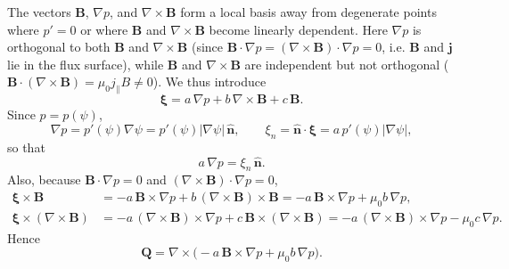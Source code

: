 \documentclass[10pt,a4paper]{article}
\numberwithin{equation}{section}
\begin{document}
The vectors $\mathbf{B}$, $\nabla p$, and $\nabla\times\mathbf{B}$ form a local
basis away from degenerate points where \(p'=0\) or where \(\mathbf B\) and
\(\nabla\times\mathbf B\) become linearly dependent.  Here $\nabla p$ is
orthogonal to both $\mathbf B$ and $\nabla\times\mathbf B$ (since
$\mathbf{B}\cdot\nabla p = (\nabla\times\mathbf{B})\cdot\nabla p = 0$, i.e.
$\mathbf B$ and $\mathbf j$ lie in the flux surface), while $\mathbf B$ and
$\nabla\times\mathbf B$ are independent but not orthogonal
($\mathbf{B}\cdot(\nabla\times\mathbf{B})=\mu_0 j_\parallel B\neq0$). We thus
introduce
\begin{equation}
\boldsymbol{\xi}
=
a\,\nabla p + b\,\nabla\times\mathbf B + c\,\mathbf B.
\end{equation}
Since \(p=p(\psi)\),
\begin{equation}
\nabla p = p'(\psi)\nabla\psi = p'(\psi)|\nabla\psi|\,\hat{\mathbf n},
\qquad
\xi_n = \hat{\mathbf n}\cdot\boldsymbol{\xi} = a\,p'(\psi)|\nabla\psi|,
\end{equation}
so that
\begin{equation}
a\,\nabla p = \xi_n\,\hat{\mathbf n}.
\end{equation}
Also, because \(\mathbf B\cdot\nabla p=0\) and \((\nabla\times\mathbf B)\cdot\nabla p=0\),
\begin{align}
\boldsymbol{\xi}\times\mathbf B
&=
-a\,\mathbf B\times\nabla p
+b\,(\nabla\times\mathbf B)\times\mathbf B
=
-a\,\mathbf B\times\nabla p+\mu_0 b\,\nabla p, \\
\boldsymbol{\xi}\times(\nabla\times\mathbf B)
&=
-a\,(\nabla\times\mathbf B)\times\nabla p
+c\,\mathbf B\times(\nabla\times\mathbf B)
=
-a\,(\nabla\times\mathbf B)\times\nabla p-\mu_0 c\,\nabla p.
\end{align}
Hence
\begin{equation}
\mathbf Q
=
\nabla\times\bigl(-a\,\mathbf B\times\nabla p+\mu_0 b\,\nabla p\bigr).
\end{equation}
\end{document}

